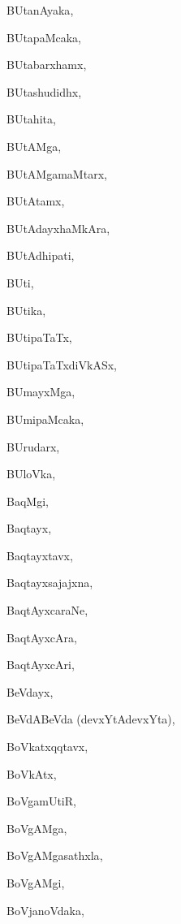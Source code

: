 \begin{multicols}{2}
{BUtanAyaka}, \pageref{BUtanAyaka}

{BUtapaMcaka}, \pageref{BUtapaMcaka}

{BUtabarxhamx}, \pageref{BUtabarxhamx}

{BUtashudidhx}, \pageref{BUtashudidhx}

{BUtahita}, \pageref{BUtahita}

{BUtAMga}, \pageref{BUtAMga}

{BUtAMgamaMtarx}, \pageref{BUtAMgamaMtarx}

{BUtAtamx}, \pageref{BUtAtamx}

{BUtAdayxhaMkAra}, \pageref{BUtAdayxhaMkAra}

{BUtAdhipati}, \pageref{BUtAdhipati}

{BUti}, \pageref{BUti}

{BUtika}, \pageref{BUtika}

{BUtipaTaTx}, \pageref{BUtipaTaTx}

{BUtipaTaTxdiVkASx}, \pageref{BUtipaTaTxdiVkASx}

{BUmayxMga}, \pageref{BUmayxMga}

{BUmipaMcaka}, \pageref{BUmipaMcaka}

{BUrudarx}, \pageref{BUrudarx}

{BUloVka}, \pageref{BUloVka}

{BaqMgi}, \pageref{BaqMgi}

{Baqtayx}, \pageref{Baqtayx}

{Baqtayxtavx}, \pageref{Baqtayxtavx}

{Baqtayxsajajxna}, \pageref{Baqtayxsajajxna}

{BaqtAyxcaraNe}, \pageref{BaqtAyxcaraNe}

{BaqtAyxcAra}, \pageref{BaqtAyxcAra}

{BaqtAyxcAri}, \pageref{BaqtAyxcAri}

{BeVdayx}, \pageref{BeVdayx}

{BeVdABeVda (devxYtAdevxYta)}, \pageref{BeVdABeVdadevxYtAdevxYta}

{BoVkatxqqtavx}, \pageref{BoVkatxqqtavx}

{BoVkAtx}, \pageref{BoVkAtx}

{BoVgamUtiR}, \pageref{BoVgamUtiR}

{BoVgAMga}, \pageref{BoVgAMga}

{BoVgAMgasathxla}, \pageref{BoVgAMgasathxla}

{BoVgAMgi}, \pageref{BoVgAMgi}

{BoVjanoVdaka}, \pageref{BoVjanoVdaka}


\end{multicols}
